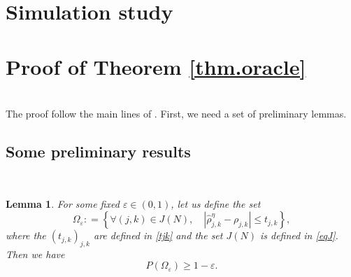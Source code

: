 \documentclass[a4paper]{amsart}
\newtheorem{lemma}{Lemma}[section]
\newcommand{\deq}{\mathrel{\mathop:} = } %
\begin{document}
\section{Simulation study}
\label{sec.simulations}






\section{Proof of Theorem \ref{thm.oracle}}
\label{sec.proofs}
\noindent\\

The proof follow the main lines of \cite{Alquier2008a,Alquier2008b}. First, we
need
a set of preliminary lemmas.

\subsection{Some preliminary results}
\noindent\\


\begin{lemma}
                \label{lem.deviation}
                For some fixed $\varepsilon\in(0,1)$, let us define the set
                $$
                \Omega_{\varepsilon}\deq \left\{ \forall (j,k)\in J(N),\quad
\left|\hat{\rho}^\eta_{j,k} - \rho_{j,k} \right| \leq t_{j,k} \right\},
                $$
                where the $( t_{j,k})_{j,k}$ are defined in \eqref{tjk} and the
set $J(N)$ is defined in \eqref{eqJ}. Then we have
                $$P(\Omega_{\varepsilon})\geq1-\varepsilon.$$
\end{lemma}
\end{document}
